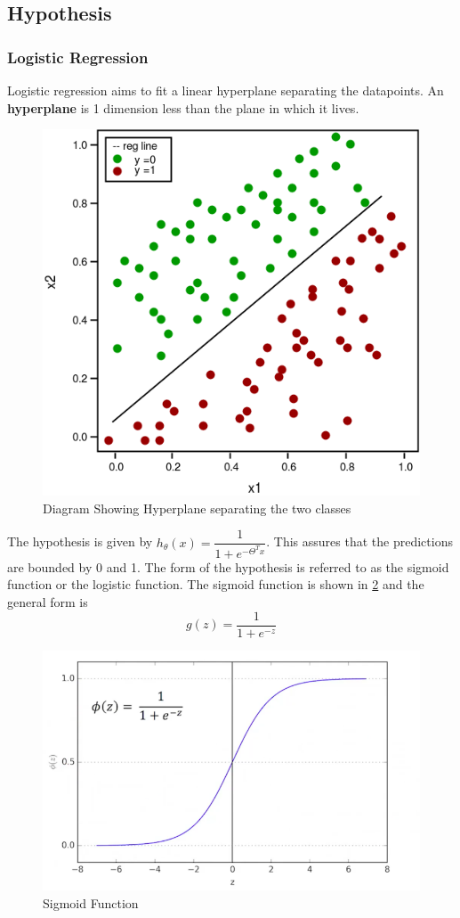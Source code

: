 \documentclass[12pt,a4paper,titlepage,portrait,openany]{book}
\begin{document}
	 
	\subsection{Hypothesis}
	\subsubsection{Logistic Regression}
	Logistic regression aims to fit a linear hyperplane separating the datapoints. An \textbf{hyperplane} is 1 dimension less than the plane in which it lives. 

	\begin{figure}
		\centering
		\includegraphics[width=0.8\linewidth ]{logistic-regression}
		
		\caption[]{Diagram Showing Hyperplane separating the two classes\protect\footnotemark}
		\label{fig:logistic-regression}
	\end{figure}
	The hypothesis is given by  $h_\theta(x) = \dfrac{1}{1+e^{-\Theta^Tx}}$. This assures that the predictions are bounded by 0 and 1. The form of the hypothesis is referred to as the sigmoid function or the logistic function. The sigmoid function is shown in \ref{fig:sigmoid} and the general form is $$g(z) = \dfrac{1}{1+e^{-z}} $$
	
	\begin{figure}
		\centering
		\includegraphics[width=0.7\linewidth]{sigmoid}
		\caption[Sigmoid]{Sigmoid Function\protect\footnotemark}
		\label{fig:sigmoid}
	\end{figure}
	
\end{document}
